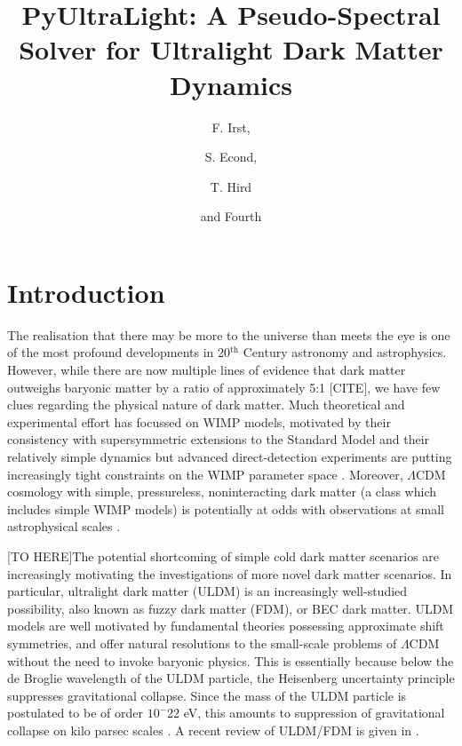\documentclass[a4paper,11pt]{article}
\title{ PyUltraLight: A Pseudo-Spectral Solver for Ultralight Dark Matter Dynamics}
\author[a,b,1]{F. Irst,\note{Corresponding author.}}
\author[c]{S. Econd,}
\author[a,2]{T. Hird\note{Also at Some University.}}
\author[a,2]{and Fourth}
\affiliation[a]{One University,\\some-street, Country}
\affiliation[b]{Another University,\\different-address, Country}
\affiliation[c]{A School for Advanced Studies,\\some-location, Country}
\begin{document}
\maketitle
\flushbottom

\section{Introduction}
\label{sec:intro}

The realisation that there may be more to the universe than meets the eye is one of the most profound developments in 20$^{\textrm{th}}$ Century astronomy and astrophysics. However,  while there are now multiple lines of evidence that dark matter outweighs baryonic matter by a ratio of approximately 5:1 [CITE], we have few clues regarding the physical nature of dark matter.  Much theoretical and experimental effort has focussed on  WIMP models, motivated by their consistency with supersymmetric extensions to the Standard Model and their relatively simple dynamics but advanced direct-detection experiments are putting increasingly tight constraints on the WIMP parameter space \cite{Tan2016, Akerib2017}. Moreover, $\Lambda$CDM cosmology with simple, pressureless, noninteracting dark matter (a class which includes simple WIMP models) is potentially at odds with observations at small astrophysical scales \cite{Bull2016}.  

[TO HERE]The potential shortcoming of simple cold dark matter scenarios are increasingly motivating the investigations of more novel dark matter scenarios. In particular, ultralight dark matter (ULDM) is an increasingly well-studied possibility, also known as fuzzy dark matter (FDM), or BEC dark matter. ULDM models are well motivated by fundamental theories possessing approximate shift symmetries, and offer natural resolutions to the small-scale problems of $\Lambda$CDM without the need to invoke baryonic physics. This is essentially because below the de Broglie wavelength of the ULDM particle, the Heisenberg uncertainty principle suppresses gravitational collapse. Since the mass of the ULDM particle is postulated to be of order $10^-22$ eV, this amounts to suppression of gravitational collapse on kilo parsec scales \cite{Hu2000}. A recent review of ULDM/FDM is given in \cite{Hui2016}.
\end{document}
